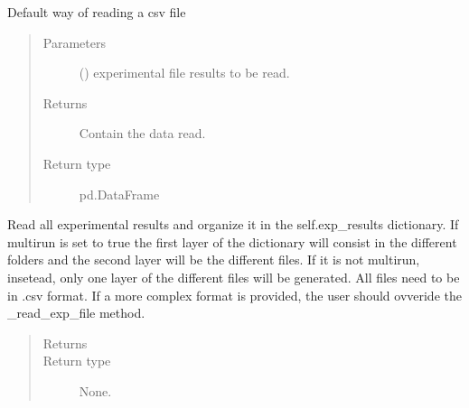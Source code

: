 \documentclass[letterpaper,10pt,english]{sphinxmanual}
\begin{document}
\begin{fulllineitems}

\begin{fulllineitems}
\label{\detokenize{api/postprocessing:expoutput.ExperimentalOutput._read_exp_file}}
Default way of reading a csv file
\begin{quote}\begin{description}
\item[{Parameters}] \leavevmode
{} () \textendash{} experimental file results to be read.

\item[{Returns}] \leavevmode
Contain the data read.

\item[{Return type}] \leavevmode
pd.DataFrame

\end{description}\end{quote}

\end{fulllineitems}


\begin{fulllineitems}
\label{\detokenize{api/postprocessing:expoutput.ExperimentalOutput._read_exp_results}}
Read all experimental results and organize it in the self.exp\_results
dictionary.
If multirun is set to true the first layer of the dictionary will
consist in the different folders and the second layer will be the
different files. If it is not multirun, insetead, only one layer of the
different files will be generated.
All files need to be in .csv format. If a more complex format is
provided, the user should ovveride the \_read\_exp\_file method.
\begin{quote}\begin{description}
\item[{Returns}] \leavevmode


\item[{Return type}] \leavevmode
None.


\end{description}
\end{quote}
\end{fulllineitems}
\end{fulllineitems}
\end{document}
